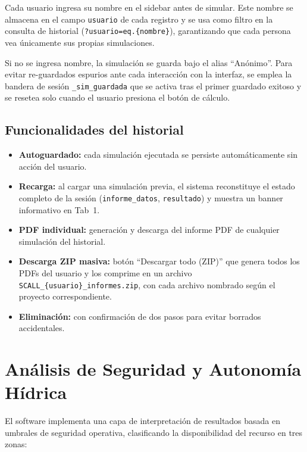 \documentclass[12pt, a4paper]{article}
\begin{document}
Cada usuario ingresa su nombre en el sidebar antes de simular. Este nombre se almacena en el campo \texttt{usuario} de cada registro y se usa como filtro en la consulta de historial (\texttt{?usuario=eq.\{nombre\}}), garantizando que cada persona vea únicamente sus propias simulaciones.

Si no se ingresa nombre, la simulación se guarda bajo el alias ``Anónimo''. Para evitar re-guardados espurios ante cada interacción con la interfaz, se emplea la bandera de sesión \texttt{\_sim\_guardada} que se activa tras el primer guardado exitoso y se resetea solo cuando el usuario presiona el botón de cálculo.

\subsection{Funcionalidades del historial}

\begin{itemize}
    \item \textbf{Autoguardado:} cada simulación ejecutada se persiste automáticamente sin acción del usuario.
    \item \textbf{Recarga:} al cargar una simulación previa, el sistema reconstituye el estado completo de la sesión (\texttt{informe\_datos}, \texttt{resultado}) y muestra un banner informativo en Tab~1.
    \item \textbf{PDF individual:} generación y descarga del informe PDF de cualquier simulación del historial.
    \item \textbf{Descarga ZIP masiva:} botón ``Descargar todo (ZIP)'' que genera todos los PDFs del usuario y los comprime en un archivo \texttt{SCALL\_\{usuario\}\_informes.zip}, con cada archivo nombrado según el proyecto correspondiente.
    \item \textbf{Eliminación:} con confirmación de dos pasos para evitar borrados accidentales.
\end{itemize}

\section{Análisis de Seguridad y Autonomía Hídrica}

El software implementa una capa de interpretación de resultados basada en umbrales de seguridad operativa, clasificando la disponibilidad del recurso en tres zonas:
\end{document}
